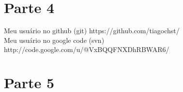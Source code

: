 \documentclass[10pt,a4paper]{article}
\begin{document}
\section{Parte 4}
Meu usuário no github (git) https://github.com/tiagochst/\\
Meu usuário no google code (svn) http://code.google.com/u/@VxBQQFNXDhRBWAR6/
\section{Parte 5}

% 
%   
\end{document}
